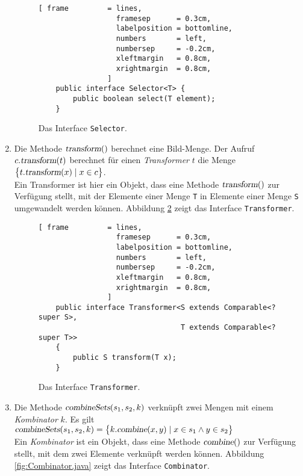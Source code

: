 \begin{enumerate}
\begin{figure}[!h]
\centering
\begin{Verbatim}[ frame         = lines, 
                  framesep      = 0.3cm, 
                  labelposition = bottomline,
                  numbers       = left,
                  numbersep     = -0.2cm,
                  xleftmargin   = 0.8cm,
                  xrightmargin  = 0.8cm,
                ]
    public interface Selector<T> {
        public boolean select(T element);
    }
\end{Verbatim}
\vspace*{-0.3cm}
\caption{Das Interface \texttt{Selector}.}
\label{fig:Selector.java}
\end{figure}

\item Die Methode $\textsl{transform}()$ berechnet eine Bild-Menge.
      Der Aufruf $c.\textsl{transform}(t)$ berechnet f\"ur einen
      \emph{Transformer} $t$ die Menge
      \\[0.2cm]
      \hspace*{1.3cm}
      $\bigl\{ t.\textsl{transform}(x) \mid x \in c \bigr\}$.
      \\[0.2cm]
      Ein Transformer ist hier ein Objekt, dass eine Methode
      $\textsl{transform}()$ zur Verf\"ugung stellt, mit der Elemente einer Menge \texttt{T}
      in Elemente einer Menge \texttt{S} umgewandelt werden k\"onnen.
      Abbildung
      \ref{fig:Transformer.java} zeigt das Interface \texttt{Transformer}.

\begin{figure}[!h]
\centering
\begin{Verbatim}[ frame         = lines, 
                  framesep      = 0.3cm, 
                  labelposition = bottomline,
                  numbers       = left,
                  numbersep     = -0.2cm,
                  xleftmargin   = 0.8cm,
                  xrightmargin  = 0.8cm,
                ]
    public interface Transformer<S extends Comparable<? super S>, 
                                 T extends Comparable<? super T>> 
    {
        public S transform(T x);
    }
\end{Verbatim}
\vspace*{-0.3cm}
\caption{Das Interface \texttt{Transformer}.}
\label{fig:Transformer.java}
\end{figure}

\item Die Methode $\textsl{combineSets}(s_1, s_2, k)$ verkn\"upft zwei Mengen 
      mit einem \emph{Kombinator} $k$.  Es gilt
      \\[0.2cm]
      \hspace*{1.3cm}
      $\textsl{combineSets}(s_1, s_2, k) = 
      \bigl\{ k.\textsl{combine}(x,y) \mid x \in s_1 \wedge y \in s_2 \bigr\}$
      \\[0.2cm]
      Ein \emph{Kombinator} ist  ein Objekt, dass eine Methode
      $\textsl{combine}()$ zur Verf\"ugung stellt, mit dem zwei Elemente 
      verkn\"upft werden k\"onnen.
      Abbildung
      \ref{fig:Combinator.java} zeigt das Interface \texttt{Combinator}.


\end{enumerate}
